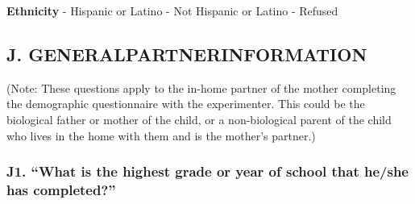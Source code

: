 \documentclass[
  12pt,
]{book}
\begin{document}
\textbf{Ethnicity}
- Hispanic or Latino
- Not Hispanic or Latino
- Refused

\hypertarget{j.-generalpartnerinformation}{%
\subsection*{J. GENERALPARTNERINFORMATION}\label{j.-generalpartnerinformation}}

(Note: These questions apply to the in-home partner of the mother completing the demographic questionnaire with the experimenter. This could be the biological father or mother of the child, or a non-biological parent of the child who lives in the home with them and is the mother's partner.)

\hypertarget{j1.-what-is-the-highest-grade-or-year-of-school-that-heshe-has-completed}{%
\subsubsection*{J1. ``What is the highest grade or year of school that he/she has completed?''}\label{j1.-what-is-the-highest-grade-or-year-of-school-that-heshe-has-completed}}
\end{document}
